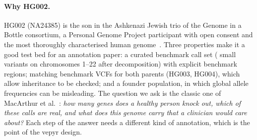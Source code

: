 \paragraph{Why HG002.} HG002 (NA24385) is the son in the Ashkenazi Jewish
trio of the Genome in a Bottle consortium, a Personal Genome Project
participant with open consent and the most thoroughly characterised human
genome~\cite{zook2016,wagner2022}. Three properties make it a good test bed
for an annotation paper: a curated benchmark call set
(\NVariants{} small variants on chromosomes 1--22 after decomposition) with
explicit benchmark regions; matching benchmark VCFs for both parents
(HG003, HG004), which allow inheritance to be checked; and a founder
population, in which global allele frequencies can be misleading. The
question we ask is the classic one of MacArthur et
al.~\cite{macarthur2012}: \emph{how many genes does a healthy person knock
out, which of these calls are real, and what does this genome carry that a
clinician would care about?} Each step of the answer needs a different kind
of annotation, which is the point of the vepyr design.

